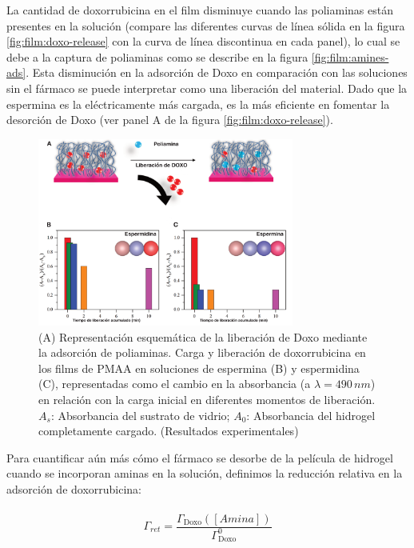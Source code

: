 La cantidad  de doxorrubicina en el film disminuye cuando las poliaminas est\'an presentes en la soluci\'on (compare las diferentes curvas de l\'inea s\'olida en la figura \ref{fig:film:doxo-release} con la curva de l\'inea discontinua en cada panel), lo cual se debe a la captura de poliaminas como se describe en la figura \ref{fig:film:amines-ads}. Esta disminuci\'on en la adsorci\'on de Doxo en comparaci\'on con las soluciones sin el f\'armaco se puede interpretar como una liberaci\'on del material. Dado que la espermina es la el\'ectricamente  m\'as cargada, es la m\'as eficiente en fomentar  la desorci\'on de Doxo (ver panel A de la figura \ref{fig:film:doxo-release}).



\begin{figure}[!ht]
	\centering
	\includegraphics[width=0.75\textwidth]{Figures/graph-film/fig11.pdf}
	\caption{(A) Representaci\'on esquem\'atica de la liberaci\'on de Doxo mediante la adsorci\'on de poliaminas. Carga y liberaci\'on de doxorrubicina en los films de PMAA en soluciones de espermina (B) y espermidina (C), representadas como el cambio en la absorbancia (a $\lambda=490 \, nm$) en relaci\'on con la carga inicial en diferentes momentos de liberaci\'on. $A_s$: Absorbancia del sustrato de vidrio; $A_0$: Absorbancia del hidrogel completamente cargado. (Resultados experimentales)}
	\label{fig:film:exp_doxo-amines}
\end{figure}

Para cuantificar a\'un m\'as c\'omo el f\'armaco se desorbe de la pel\'icula de hidrogel cuando se incorporan aminas en la soluci\'on, definimos la reducci\'on relativa en la adsorci\'on de doxorrubicina:


\begin{align}
	\begin{aligned}
		\Gamma_{ret}= \dfrac{\Gamma_\text{Doxo}([Amina])}{\Gamma_\text{Doxo}^0}
	\end{aligned}
	\label{eq:film:doxo-DG}
\end{align}


